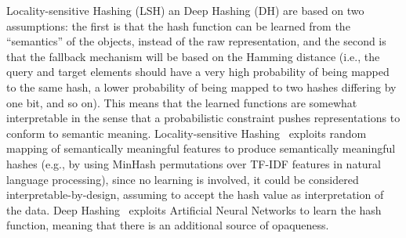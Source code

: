 Locality-sensitive Hashing (LSH) an Deep Hashing (DH) are based on two assumptions: the first is that the hash function can be learned from the ``semantics'' of the objects, instead of the raw representation, and the second is that the fallback mechanism will be based on the Hamming distance (i.e., the query and target elements should have a very high probability of being mapped to the same hash, a lower probability of being mapped to two hashes differing by one bit, and so on). This means that the learned functions are somewhat interpretable in the sense that a probabilistic constraint pushes representations to conform to semantic meaning. %
Locality-sensitive Hashing~\cite{jafari2021survey} exploits random mapping of semantically meaningful features to produce semantically meaningful hashes (e.g., by using MinHash permutations over TF-IDF features in natural language processing), since no learning is involved, it could be considered interpretable-by-design, assuming to accept the hash value as interpretation of the data.
Deep Hashing~\cite{luo2020survey} exploits Artificial Neural Networks to learn the hash function, meaning that there is an additional source of opaqueness.%

